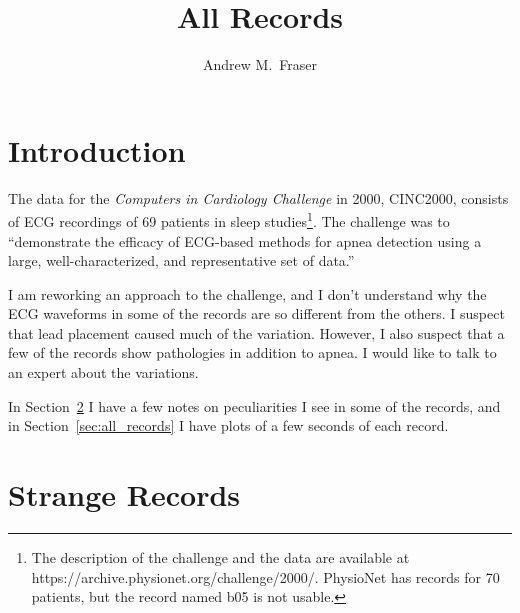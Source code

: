 \documentclass[12pt]{article}
\title{All Records}
\author{Andrew M.\ Fraser}
\begin{document}
\maketitle

\section{Introduction}
\label{sec:introduction}

The data for the \emph{Computers in Cardiology Challenge} in 2000,
CINC2000, consists of ECG recordings of 69 patients in sleep
studies\footnote{The description of the challenge and the data are
available at https://archive.physionet.org/challenge/2000/.  PhysioNet
has records for 70 patients, but the record named b05 is not
usable.}.  The challenge was to ``demonstrate the efficacy of
ECG-based methods for apnea detection using a large,
well-characterized, and representative set of data.''

I am reworking an approach to the challenge, and I don't understand
why the ECG waveforms in some of the records are so different from the
others.  I suspect that lead placement caused much of the variation.
However, I also suspect that a few of the records show pathologies in
addition to apnea.  I would like to talk to an expert about the
variations.

In Section~\ref{sec:strange_records} I have a few notes on
peculiarities I see in some of the records, and in
Section~\ref{sec:all_records} I have plots of a few seconds of each
record.

\section{Strange Records}
\label{sec:strange_records}
\end{document}

